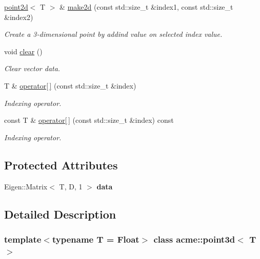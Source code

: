 \begin{DoxyCompactItemize}
\hyperlink{classacme_1_1point2d}{point2d}$<$ T $>$ \& \hyperlink{classacme_1_1point3d_a724a96c6ad4aa84b0236a8113d99d4a4}{make2d} (const std\+::size\+\_\+t \&index1, const std\+::size\+\_\+t \&index2)
\begin{DoxyCompactList}\small\item\em Create a 3-\/dimensional point by addind value on selected index value. \end{DoxyCompactList}\item 
\mbox{\label{classacme_1_1pointnd_a2d0b84e609dc1ad5cbbe631c5bb5791f}} 
void \hyperlink{classacme_1_1pointnd_a2d0b84e609dc1ad5cbbe631c5bb5791f}{clear} ()
\begin{DoxyCompactList}\small\item\em Clear vector data. \end{DoxyCompactList}\item 
T \& \hyperlink{classacme_1_1pointnd_a35b0691673728d98d455c007612d6b91}{operator\mbox{[}$\,$\mbox{]}} (const std\+::size\+\_\+t \&index)
\begin{DoxyCompactList}\small\item\em Indexing operator. \end{DoxyCompactList}\item 
const T \& \hyperlink{classacme_1_1pointnd_a565e9ed195c8f8dadc570a029a3deb94}{operator\mbox{[}$\,$\mbox{]}} (const std\+::size\+\_\+t \&index) const
\begin{DoxyCompactList}\small\item\em Indexing operator. \end{DoxyCompactList}\end{DoxyCompactItemize}
\subsection*{Protected Attributes}
\begin{DoxyCompactItemize}
\item 
\mbox{\label{classacme_1_1pointnd_a13b19080ed617e2a9c5d6058f07d4f4b}} 
Eigen\+::\+Matrix$<$ T, D, 1 $>$ {\bfseries data}
\end{DoxyCompactItemize}


\subsection{Detailed Description}
\subsubsection*{template$<$typename T = Float$>$\newline
class acme\+::point3d$<$ T $>$}

